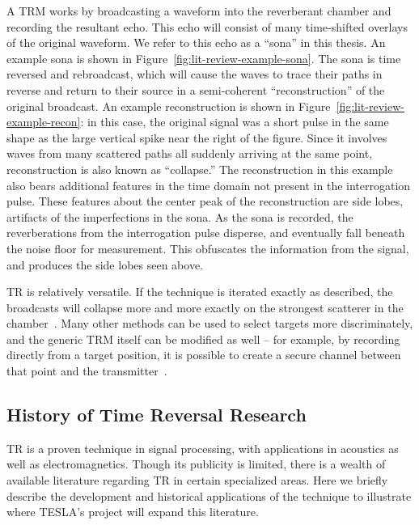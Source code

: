 A TRM works by broadcasting a waveform into the reverberant chamber and recording the resultant echo. This echo will consist of many time-shifted overlays of the original waveform. We refer to this echo as a ``sona'' in this thesis. An example sona is shown in Figure~\ref{fig:lit-review-example-sona}. The sona is time reversed and rebroadcast, which will cause the waves to trace their paths in reverse and return to their source in a semi-coherent ``reconstruction'' of the original broadcast. An example reconstruction is shown in Figure~\ref{fig:lit-review-example-recon}: in this case, the original signal was a short pulse in the same shape as the large vertical spike near the right of the figure. Since it involves waves from many scattered paths all suddenly arriving at the same point, reconstruction is also known as ``collapse.'' The reconstruction in this example also bears additional features in the time domain not present in the interrogation pulse. These features about the center peak of the reconstruction are side lobes, artifacts of the imperfections in the sona. As the sona is recorded, the reverberations from the interrogation pulse disperse, and eventually fall beneath the noise floor for measurement. This obfuscates the information from the signal, and produces the side lobes seen above.

TR is relatively versatile. If the technique is iterated exactly as described, the broadcasts will collapse more and more exactly on the strongest scatterer in the chamber~\cite{fink_time-reversed_1999}. Many other methods can be used to select targets more discriminately, and the generic TRM itself can be modified as well -- for example, by recording directly from a target position, it is possible to create a secure channel between that point and the transmitter~\cite{nltr-wave-chaotic}.

\subsection{History of Time Reversal Research}

TR is a proven technique in signal processing, with applications in acoustics as well as electromagnetics. Though its publicity is limited, there is a wealth of available literature regarding TR in certain specialized areas. Here we briefly describe the development and historical applications of the technique to illustrate where TESLA's project will expand this literature.

